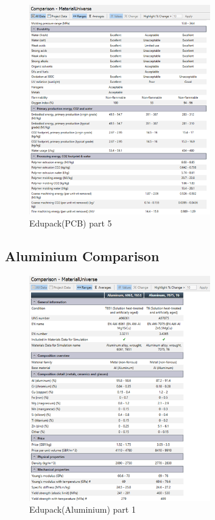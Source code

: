                 \begin{figure}[htbp]
                    \centering
                    \includegraphics[width=0.7\textwidth]{figures/Appendix-Mats/Fig5PCB.png}
                    \caption*{Edupack(PCB) part 5} 
                    \label{fig:PCB4}
                    \end{figure}

  \subsection{Aluminium Comparison}    

  \begin{figure}[htbp]
    \centering
    \includegraphics[width=0.7\textwidth]{figures/Appendix-Mats/Fig1Alu.png}
    \caption*{Edupack(Aluminium) part 1} 
    \label{fig:Alu0}
    \end{figure}

